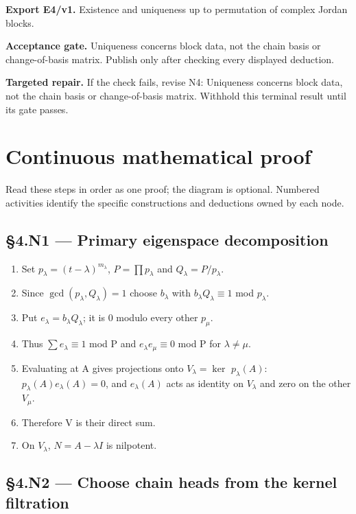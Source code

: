 \documentclass[preprint,12pt,aps,pra,showkeys,amsmath,amssymb,superscriptaddress,floatfix]{revtex4-2}
\theoremstyle{definition}
\theoremstyle{remark}
\newcommand{\field}[2]{\par\smallskip\noindent\textbf{#1.} #2\par}
\begin{document}
\field{Export E4/v1}{Existence and uniqueness up to permutation of complex Jordan blocks.}

\field{Acceptance gate}{Uniqueness concerns block data, not the chain basis or change-of-basis
matrix. Publish only after checking every displayed deduction.}

\field{Targeted repair}{If the check fails, revise N4: Uniqueness concerns block data, not the
chain basis or change-of-basis matrix. Withhold this terminal result
until its gate passes.}

\endgroup\clearpage\section{Continuous mathematical proof}\label{sec:proof}

Read these steps in order as one proof; the diagram is optional.
Numbered activities identify the specific constructions and deductions
owned by each node.

\subsection{§4.N1 --- Primary eigenspace
decomposition}\label{n1-primary-eigenspace-decomposition}

\begin{enumerate}
\def\labelenumi{\arabic{enumi}.}
\item
  Set \(p_\lambda =(t-\lambda )^{m_\lambda }\), \(P=\prod p_\lambda\)
  and \(Q_\lambda =P/p_\lambda\).
\item
  Since \(\operatorname{gcd} (p_\lambda ,Q_\lambda )=1\) choose
  \(b_\lambda\) with \(b_\lambda Q_\lambda \equiv 1\) mod \(p_\lambda\).
\item
  Put \(e_\lambda =b_\lambda Q_\lambda\); it is 0 modulo every other
  \(p_\mu\).
\item
  Thus \(\sum e_\lambda \equiv 1\) mod P and
  \(e_\lambda e_\mu \equiv 0\) mod P for \(\lambda \ne \mu\).
\item
  Evaluating at A gives projections onto
  \(V_\lambda =\operatorname{ker}\) \(p_\lambda (A)\):
  \(p_\lambda (A)e_\lambda (A)=0\), and \(e_\lambda (A)\) acts as
  identity on \(V_\lambda\) and zero on the other \(V_\mu\).
\item
  Therefore V is their direct sum.
\item
  On \(V_\lambda\), \(N=A-\lambda I\) is nilpotent.
\end{enumerate}

\subsection{§4.N2 --- Choose chain heads from the kernel
filtration}\label{n2-choose-chain-heads-from-the-kernel-filtration}
\end{document}

